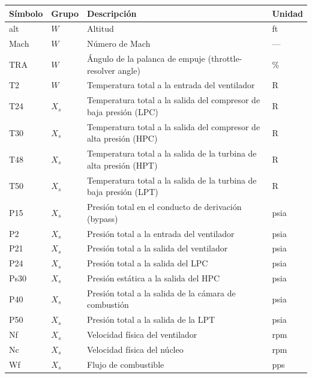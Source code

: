 \begin{tabular}{llp{8.6cm}l}
\toprule
\textbf{Símbolo} & \textbf{Grupo} & \textbf{Descripción} & \textbf{Unidad} \\
\midrule
alt & $W$ & Altitud & ft \\
Mach & $W$ & Número de Mach & — \\
TRA & $W$ & Ángulo de la palanca de empuje (throttle-resolver angle) & \% \\
T2 & $W$ & Temperatura total a la entrada del ventilador & \textdegree{}R \\
T24 & $X_s$ & Temperatura total a la salida del compresor de baja presión (LPC) & \textdegree{}R \\
T30 & $X_s$ & Temperatura total a la salida del compresor de alta presión (HPC) & \textdegree{}R \\
T48 & $X_s$ & Temperatura total a la salida de la turbina de alta presión (HPT) & \textdegree{}R \\
T50 & $X_s$ & Temperatura total a la salida de la turbina de baja presión (LPT) & \textdegree{}R \\
P15 & $X_s$ & Presión total en el conducto de derivación (bypass) & psia \\
P2 & $X_s$ & Presión total a la entrada del ventilador & psia \\
P21 & $X_s$ & Presión total a la salida del ventilador & psia \\
P24 & $X_s$ & Presión total a la salida del LPC & psia \\
Ps30 & $X_s$ & Presión estática a la salida del HPC & psia \\
P40 & $X_s$ & Presión total a la salida de la cámara de combustión & psia \\
P50 & $X_s$ & Presión total a la salida de la LPT & psia \\
Nf & $X_s$ & Velocidad física del ventilador & rpm \\
Nc & $X_s$ & Velocidad física del núcleo & rpm \\
Wf & $X_s$ & Flujo de combustible & pps \\
\bottomrule
\end{tabular}
